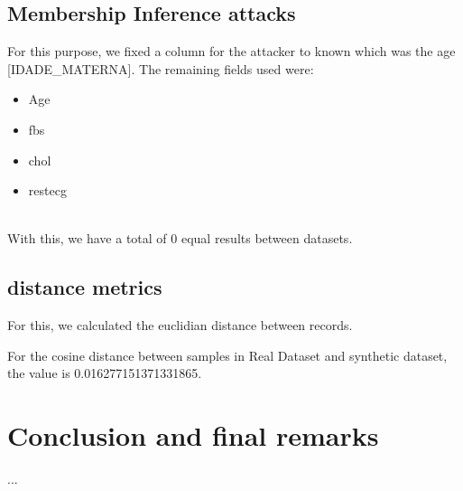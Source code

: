 \documentclass{article}
\begin{document}
\subsection{Membership Inference attacks}
For this purpose, we fixed a column for the attacker to known which was the age [IDADE\_MATERNA].
The remaining fields used were:
\begin{itemize}
 
  \item Age
     
  \item fbs
     
  \item chol
     
  \item restecg
     
  \end{itemize}
\\
With this, we have a total of 0 equal results between datasets.

\subsection{distance metrics}

For this, we calculated the euclidian distance between records.

For the cosine distance between samples in Real Dataset and synthetic dataset, the value is 0.016277151371331865.



\section{Conclusion and final remarks}

...

\cleardoublepage
\printglossary[type=\acronymtype]
\cleardoublepage


\end{document}
